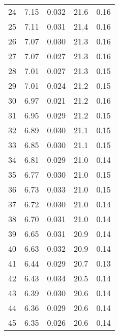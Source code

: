 \begin{table}
\begin{tabular}{c|ll|ll}
24 & 7.15 & 0.032 & 21.6 & 0.16 \\
25 & 7.11 & 0.031 & 21.4 & 0.16 \\
26 & 7.07 & 0.030 & 21.3 & 0.16 \\
27 & 7.07 & 0.027 & 21.3 & 0.16 \\
28 & 7.01 & 0.027 & 21.3 & 0.15 \\
29 & 7.01 & 0.024 & 21.2 & 0.15 \\
30 & 6.97 & 0.021 & 21.2 & 0.16 \\
31 & 6.95 & 0.029 & 21.2 & 0.15 \\
32 & 6.89 & 0.030 & 21.1 & 0.15 \\
33 & 6.85 & 0.030 & 21.1 & 0.15 \\
34 & 6.81 & 0.029 & 21.0 & 0.14 \\
35 & 6.77 & 0.030 & 21.0 & 0.15 \\
36 & 6.73 & 0.033 & 21.0 & 0.15 \\
37 & 6.72 & 0.030 & 21.0 & 0.14 \\
38 & 6.70 & 0.031 & 21.0 & 0.14 \\
39 & 6.65 & 0.031 & 20.9 & 0.14 \\
40 & 6.63 & 0.032 & 20.9 & 0.14 \\
41 & 6.44 & 0.029 & 20.7 & 0.13 \\
42 & 6.43 & 0.034 & 20.5 & 0.14 \\
43 & 6.39 & 0.030 & 20.6 & 0.14 \\
44 & 6.36 & 0.029 & 20.6 & 0.14 \\
45 & 6.35 & 0.026 & 20.6 & 0.14 \\
               \hline
        \end{tabular}
    \end{table}
    \clearpage

